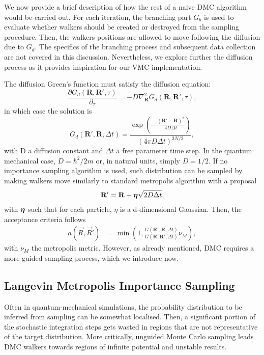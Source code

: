 We now provide a brief description of how the rest of a naive DMC algorithm would be carried out. For each iteration, the branching part $G_b$ is used to evaluate whether walkers should be created or destroyed from the sampling procedure. Then, the walkers positions are allowed to move following the diffusion due to $G_d$. The specifics of the branching process and subsequent data collection are not covered in this discussion. Nevertheless, we explore further the diffusion process as it provides inspiration for our VMC implementation.

The diffusion Green's function must satisfy the diffusion equation:
\begin{equation}
    \frac{\partial G_d(\mathbf{R},\mathbf{R}',\tau)}{\partial_\tau} = -D \nabla^2_\mathbf{R}G_d(\mathbf{R},\mathbf{R}',\tau),
\end{equation}
in which case the solution is 
\begin{equation}
    G_d(\mathbf{R}',\mathbf{R},\Delta t) = \frac{\exp{\left(-\frac{(\mathbf{R}'-\mathbf{R})^2}{4D\Delta t}\right)}}{(4\pi D\Delta t)^{3N/2}}, 
\end{equation}
with D a diffusion constant and $\Delta t$ a free parameter time step. In the quantum mechanical case, $D = \hbar^2/2m$ or, in natural units, simply $D = 1/2$. If no importance sampling algorithm is used, such distribution can be sampled by making walkers move similarly to standard metropolis algorithm with a proposal
\begin{align*}
    \mathbf{R}' = \mathbf{R} + \boldsymbol{\eta}\sqrt{2D\Delta t},
\end{align*}
with $\boldsymbol{\eta}$ such that for each particle, $\eta$ is a d-dimensional Gaussian. Then, the acceptance criteria follows
\begin{align*}
    a(\Vec{R}, \Vec{R}') &= \min\left(1, \frac{G(\mathbf{R}',\mathbf{R}, \Delta t)}{G(\mathbf{R}, \mathbf{R}', \Delta t)}\nu_M\right),
\end{align*}
with $\nu_M$ the metropolis metric. However, as already mentioned, DMC requires a more guided sampling process, which we introduce now. 

\subsection{Langevin Metropolis Importance Sampling}\label{sec:langevin_imporance}
Often in quantum-mechanical simulations, the probability distribution to be inferred from sampling can be somewhat localised. Then, a significant portion of the stochastic integration steps gets wasted in regions that are not representative of the target distribution. More critically, unguided Monte Carlo sampling leads DMC walkers towards regions of infinite potential and unstable results.

